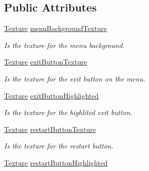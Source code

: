\subsection*{Public Attributes}
\begin{DoxyCompactItemize}
\item 
\mbox{\label{class_escape_menu_aa0b49300db0d5b0e4b4b0e4712725a02}} 
\hyperlink{class_texture}{Texture} \hyperlink{class_escape_menu_aa0b49300db0d5b0e4b4b0e4712725a02}{menu\+Background\+Texture}
\begin{DoxyCompactList}\small\item\em Is the texture for the menu background. \end{DoxyCompactList}\item 
\mbox{\label{class_escape_menu_ada3116b5ec7d80e195aed9fa9c642079}} 
\hyperlink{class_texture}{Texture} \hyperlink{class_escape_menu_ada3116b5ec7d80e195aed9fa9c642079}{exit\+Button\+Texture}
\begin{DoxyCompactList}\small\item\em Is the texture for the exit button on the menu. \end{DoxyCompactList}\item 
\mbox{\label{class_escape_menu_a6051b15974dbbd14b49c0979b5e73cdd}} 
\hyperlink{class_texture}{Texture} \hyperlink{class_escape_menu_a6051b15974dbbd14b49c0979b5e73cdd}{exit\+Button\+Highlighted}
\begin{DoxyCompactList}\small\item\em Is the texture for the highlited exit button. \end{DoxyCompactList}\item 
\mbox{\label{class_escape_menu_a99d107c99bf01d58783dae4bb11e305a}} 
\hyperlink{class_texture}{Texture} \hyperlink{class_escape_menu_a99d107c99bf01d58783dae4bb11e305a}{restart\+Button\+Texture}
\begin{DoxyCompactList}\small\item\em Is the texture for the restart button. \end{DoxyCompactList}\item 
\mbox{\label{class_escape_menu_a5020fd89d63f51edb353853920c0892f}} 
\hyperlink{class_texture}{Texture} \hyperlink{class_escape_menu_a5020fd89d63f51edb353853920c0892f}{restart\+Button\+Highlighted}

\end{DoxyCompactItemize}
